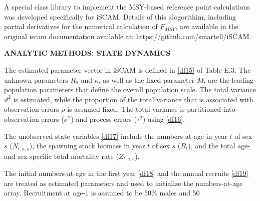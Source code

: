 \documentclass[11pt]{article}   %
\def\AppLet{E}                   %
\def\headc{\vspace{-1ex}} %
\def\subsub#1{\noindent {\bf #1} \headc}    %
\def\newp{\vfill \break}
\begin{document}
A special class library to implement the MSY-based reference point calculations was developed specifically for iSCAM.  Details of this alogorithim, including partial derivatives for the numerical calculation of $F_{MSY}$, are available in the original iscam documentation available at: https://github.com/smartell/iSCAM.     



\newp %

{ \bf ANALYTIC METHODS: STATE DYNAMICS}

The estimated parameter vector in iSCAM is defined in \eqref{df15} of Table \AppLet.3.  The unknown parameters $R_0$ and $\kappa$, as well as the fixed parameter $M$, are the leading population parameters that define the overall population scale.  The total variance $\vartheta^2$ is estimated, while the proportion of the total variance that is associated with observation errors $\rho$ is assumed fixed. The total variance is partitioned into observation errors ($\sigma^2$) and process errors ($\tau^2$) using \eqref{df16}.

The unobserved state variables \eqref{df17} include the numbers-at-age in year $t$ of sex $s$ ($N_{t,a,s}$), the spawning stock biomass in year $t$ of sex $s$ ($B_t$), and the total age- and sex-specific total mortality rate ($Z_{t,a,s}$).  

The initial numbers-at-age in the first year \eqref{df18} and the annual recruits \eqref{df19} are treated as estimated parameters and used to initialize the numbers-at-age array.  Recruitment at age-1 is assumed to be 50\% males and 50%
\end{document}
